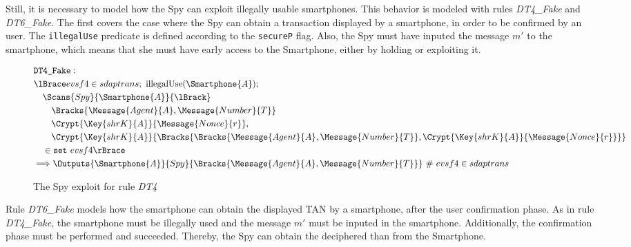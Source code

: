 Still, it is necessary to model how the Spy can exploit illegally usable smartphones. This behavior is modeled with rules \textit{DT4\_Fake} and \textit{DT6\_Fake}. The first covers the case where the Spy can obtain a transaction displayed by a smartphone, in order to be confirmed by an user. The \texttt{illegalUse} predicate is defined according to the \texttt{secureP} flag. Also, the Spy must have inputed the message \(m'\) to the smartphone, which means that she must have early access to the Smartphone, either by holding or exploiting it.

\begin{figure}[!h]
  \begin{align*}
    & \texttt{DT4\_Fake}: \\
    & \lBrace evsf4 \in sdaptrans;\ \text{illegalUse}(\Smartphone{A}); \\
    & \quad \Scans{Spy}{\Smartphone{A}}{\lBrack} \\
    & \qquad \Bracks{\Message{Agent}{A}, \Message{Number}{T}} \\
    & \qquad \Crypt{\Key{shrK}{A}}{\Message{Nonce}{r}}, \\
    & \qquad \Crypt{\Key{shrK}{A}}{\Bracks{\Bracks{\Message{Agent}{A}, \Message{Number}{T}}, \Crypt{\Key{shrK}{A}}{\Message{Nonce}{r}}}} \\
    & \quad \in \texttt{set} \ evsf4 \rBrace \\
    & \Longrightarrow \Outputs{\Smartphone{A}}{Spy}{\Bracks{\Message{Agent}{A}, \Message{Number}{T}}} \ \# \ evsf4 \in sdaptrans
  \end{align*}
  \label{fig:dap-model-threat-dt4}
  \caption{The Spy exploit for rule \textit{DT4}}
\end{figure}

Rule \textit{DT6\_Fake} models how the smartphone can obtain the displayed TAN by a smartphone, after the user confirmation phase. As in rule \textit{DT4\_Fake}, the smartphone must be illegally used and the message $m'$ must be inputed in the smartphone. Additionally, the confirmation phase must be performed and succeeded. Thereby, the Spy can obtain the deciphered than from the Smartphone.

